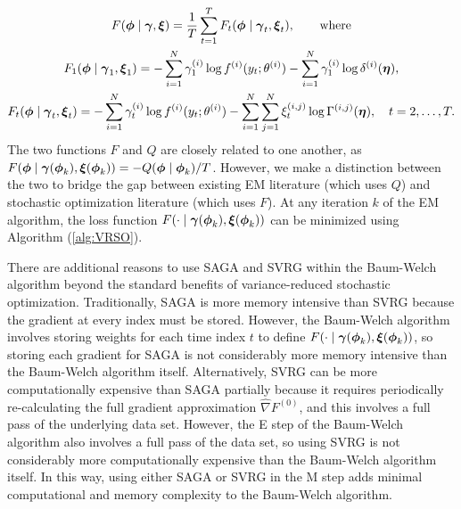 \begin{gather}
    F(\boldsymbol{\phi} \mid \boldsymbol{\gamma}, \boldsymbol{\xi}) = \frac{1}{T}\sum_{t=1}^T F_t(\boldsymbol{\phi} \mid \boldsymbol{\gamma}_t , \boldsymbol{\xi}_t), \qquad \text{where} \\
    F_1(\boldsymbol{\phi} \mid \boldsymbol{\gamma}_1,\boldsymbol{\xi}_1) = - \sum_{i=1}^N \gamma^{(i)}_1 \log f^{(i)}(y_t;\theta^{(i)}) - \sum_{i=1}^N \gamma^{(i)}_1 \log \delta^{(i)}(\boldsymbol{\eta}), \\
    F_t(\boldsymbol{\phi} \mid \boldsymbol{\gamma}_t , \boldsymbol{\xi}_t) = - \sum_{i=1}^N \gamma^{(i)}_t \log f^{(i)}(y_t;\theta^{(i)}) - \sum_{i=1}^N \sum_{j=1}^N \xi^{(i,j)}_t \log \Gamma^{(i,j)}(\boldsymbol{\eta}), \quad t = 2, \ldots, T.
\end{gather}
%
%
The two functions $F$ and $Q$ are closely related to one another, as $F(\boldsymbol{\phi} \mid \boldsymbol{\gamma}(\boldsymbol{\phi}_k), \boldsymbol{\xi}(\boldsymbol{\phi}_k)) = - Q(\boldsymbol{\phi} \mid \boldsymbol{\phi}_k) / T$. However, we make a distinction between the two to bridge the gap between existing EM literature (which uses $Q$) and stochastic optimization literature (which uses $F$). At any iteration $k$ of the EM algorithm, the loss function $F(\cdot \mid \boldsymbol{\gamma}(\boldsymbol{\phi}_k),\boldsymbol{\xi}(\boldsymbol{\phi}_k))$ can be minimized using Algorithm (\ref{alg:VRSO}). %

There are additional reasons to use SAGA and SVRG within the Baum-Welch algorithm beyond the standard benefits of variance-reduced stochastic optimization. Traditionally, SAGA is more memory intensive than SVRG because the gradient at every index must be stored. However, the Baum-Welch algorithm involves storing weights for each time index $t$ to define $F(\cdot \mid \boldsymbol{\gamma}(\boldsymbol{\phi}_k), \boldsymbol{\xi}(\boldsymbol{\phi}_k))$, so storing each gradient for SAGA is not considerably more memory intensive than the Baum-Welch algorithm itself. Alternatively, SVRG can be more computationally expensive than SAGA partially because it requires periodically re-calculating the full gradient approximation $\widehat \nabla F^{(0)}$, and this involves a full pass of the underlying data set. However, the E step of the Baum-Welch algorithm also involves a full pass of the data set, so using SVRG is not considerably more computationally expensive than the Baum-Welch algorithm itself. In this way, using either SAGA or SVRG in the M step adds minimal computational and memory complexity to the Baum-Welch algorithm.


